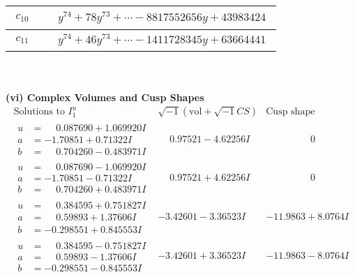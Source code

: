 \documentclass[1p]{elsarticle_modified}
\theoremstyle{definition}
\newcommand{\I}{\sqrt{-1}}
\begin{document}
\begin{tabular}{m{50pt}|m{274pt}}
\hline $$\begin{aligned}c_{10}\end{aligned}$$&$\begin{aligned}
&y^{74}+78 y^{73}+\cdots-8817552656 y+43983424
\end{aligned}$\\
\hline $$\begin{aligned}c_{11}\end{aligned}$$&$\begin{aligned}
&y^{74}+46 y^{73}+\cdots-1411728345 y+63664441
\end{aligned}$\\
\hline
\end{tabular}\\~\\
\newpage\flushleft \textbf{(vi) Complex Volumes and Cusp Shapes}
$$\begin{array}{c|c|c}  
\text{Solutions to }I^u_{1}& \I (\text{vol} + \sqrt{-1}CS) & \text{Cusp shape}\\
 \hline 
\begin{aligned}
u &= \phantom{-}0.087690 + 1.069920 I \\
a &= -1.70851 + 0.71322 I \\
b &= \phantom{-}0.704260 - 0.483971 I\end{aligned}
 & \phantom{-}0.97521 - 4.62256 I & \phantom{-0.000000 } 0 \\ \hline\begin{aligned}
u &= \phantom{-}0.087690 - 1.069920 I \\
a &= -1.70851 - 0.71322 I \\
b &= \phantom{-}0.704260 + 0.483971 I\end{aligned}
 & \phantom{-}0.97521 + 4.62256 I & \phantom{-0.000000 } 0 \\ \hline\begin{aligned}
u &= \phantom{-}0.384595 + 0.751827 I \\
a &= \phantom{-}0.59893 + 1.37606 I \\
b &= -0.298551 + 0.845553 I\end{aligned}
 & -3.42601 - 3.36523 I & -11.9863 + 8.0764 I \\ \hline\begin{aligned}
u &= \phantom{-}0.384595 - 0.751827 I \\
a &= \phantom{-}0.59893 - 1.37606 I \\
b &= -0.298551 - 0.845553 I\end{aligned}
 & -3.42601 + 3.36523 I & -11.9863 - 8.0764 I \\ \hline\begin{aligned}

\end{aligned}
\end{array}$$
\end{document}
